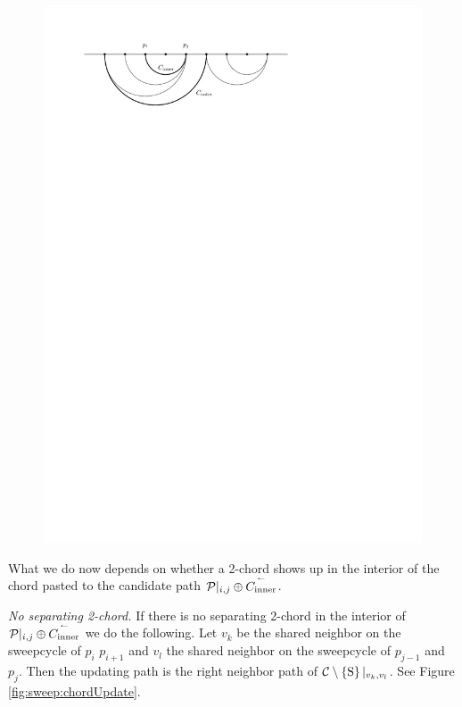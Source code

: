     \begin{figure}[b]
      \centering
      \includegraphics[scale=1]{unifiedalgo/img/sweep/chordsOnCandidatePath}
      \caption{}
      \label{fig:sweep:chordsOnCandidatePath}
    \end{figure}

    What we do now depends on whether a 2-chord shows up in the interior of the chord pasted to the candidate path $\mathcal{P}|_{i, j} \oplus \accentset{\leftharpoonup}{{C_\text{inner}}}$.

    \emph{No separating 2-chord.}
    If there is no separating 2-chord in the interior of $\mathcal{P}|_{i, j} \oplus \accentset{\leftharpoonup}{{C_\text{inner}}}$ we do the following. Let $v_k$ be the shared neighbor on the sweepcycle of $p_{i}$ $p_{i +1}$ and $v_l$ the shared neighbor on the sweepcycle  of $p_{j -1}$ and $p_{j}$. Then the updating path is the right neighbor path of $\mathcal{C} \setminus \left\lbrace {\mathrm{S}} \right\rbrace|_{v_k, v_l}$. See Figure \ref{fig:sweep:chordUpdate}.


